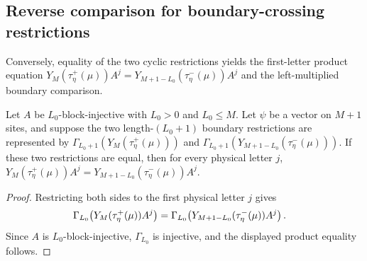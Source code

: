 \subsection{Reverse comparison for boundary-crossing restrictions}\label{subsec:normal_boundary_closing_reverse}

Conversely, equality of the two cyclic restrictions yields the first-letter
product equation
$Y_M(\tau^+_\eta(\mu))A^j = Y_{M+1-L_0}(\tau^-_\eta(\mu))A^j$ and the
left-multiplied boundary comparison.

\begin{lemma}
    \label{lem:closure_property_boundary_first_products_restrictions}
    \leanok
    Let $A$ be $L_0$-block-injective with $L_0>0$ and $L_0\le M$. Let
    $\psi$ be a vector on $M+1$ sites, and suppose the two length-$(L_0+1)$
    boundary restrictions are represented by
    $\Gamma_{L_0+1}(Y_M(\tau^+_\eta(\mu)))$ and
    $\Gamma_{L_0+1}(Y_{M+1-L_0}(\tau^-_\eta(\mu)))$.
    If these two restrictions are equal, then for every physical letter $j$,
    $Y_M(\tau^+_\eta(\mu))A^j = Y_{M+1-L_0}(\tau^-_\eta(\mu))A^j$.
\end{lemma}

\begin{proof}
    \leanok
    Restricting both sides to the first physical letter $j$ gives
    \begin{align}
        \Gamma_{L_0}\!\left(Y_M(\tau^+_\eta(\mu))A^j\right)
         & =
        \Gamma_{L_0}\!\left(Y_{M+1-L_0}(\tau^-_\eta(\mu))A^j\right).
        \notag
    \end{align}
    Since $A$ is $L_0$-block-injective, $\Gamma_{L_0}$ is injective, and the
    displayed product equality follows.
\end{proof}

